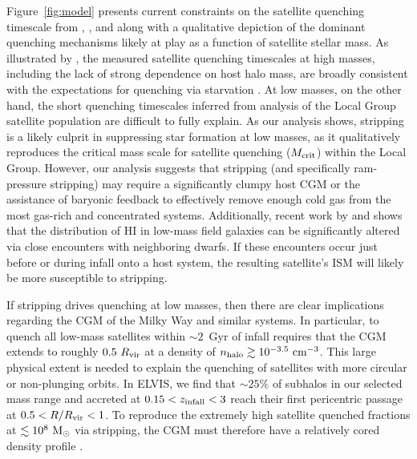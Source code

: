 Figure~\ref{fig:model} presents current constraints on the satellite
quenching timescale from \citet{wetzel13}, \citet{wheeler14}, and
\citet{fham15} along with a qualitative depiction of the dominant
quenching mechanisms likely at play as a function of satellite stellar
mass.
%
As illustrated by \citet{fham15}, the measured satellite quenching
timescales at high masses, including the lack of strong dependence on
host halo mass, are broadly consistent with the expectations for
quenching via starvation \citep[see also][]{vdb08, wetzel13}.
%
At low masses, on the other hand, the short quenching timescales
inferred from analysis of the Local Group satellite population are
difficult to fully explain.
%
As our analysis shows, stripping is a likely culprit in suppressing
star formation at low masses, as it qualitatively reproduces the
critical mass scale for satellite quenching ($M_{\rm crit}$) within
the Local Group.
%
However, our analysis suggests that stripping (and specifically
ram-pressure stripping) may require a significantly clumpy host CGM or
the assistance of baryonic feedback to effectively remove enough cold
gas from the most gas-rich and concentrated systems.
%
Additionally, recent work by \citet{pearson16} and \citet{marasco16}
shows that the distribution of H{\scriptsize I} in low-mass field
galaxies can be significantly altered via close encounters with
neighboring dwarfs. 
If these encounters occur just before or during infall onto a host
system, the resulting satellite's ISM will likely be more susceptible to
stripping. 
%

If stripping drives quenching at low masses, then there are clear
implications regarding the CGM of the Milky Way and similar systems. 
%
In particular, to quench all low-mass satellites within $\sim2$~Gyr of
infall requires that the CGM extends to roughly $0.5~R_{\rm vir}$
\citep[or $\sim150$~kpc,][]{fham15} at a density of $n_{\rm halo}
\gtrsim 10^{-3.5}~{\rm cm}^{-3}$.
%
This large physical extent is needed to explain the quenching of
satellites with more circular or non-plunging orbits.
In ELVIS, we find that $\sim 25\%$ of subhalos in our selected mass
range and accreted at $0.15 < z_{\rm infall} < 3$ reach their first
pericentric passage at $0.5 < R/R_{\rm vir} < 1$.
%
To reproduce the extremely high satellite quenched fractions at
$\lesssim10^{8}~{\rm M}_{\odot}$ via stripping, the CGM must therefore have a
relatively cored density profile \citep[e.g.][]{MB04}.



